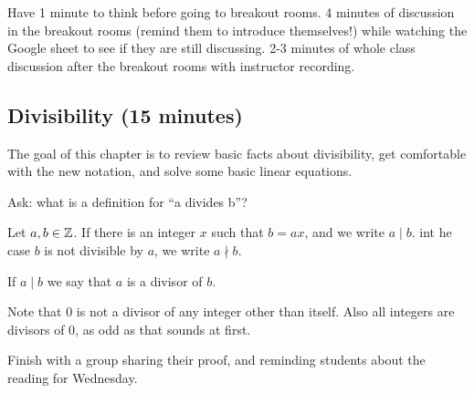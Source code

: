 \documentclass[letterpaper, 11 pt]{article}
\begin{document}
Have 1 minute to think before going to breakout rooms. 4 minutes of discussion in the breakout rooms (remind them to introduce themselves!) while watching the Google sheet to see if they are still discussing. 2-3 minutes of whole class discussion after the breakout rooms with instructor recording.

%

\subsection{Divisibility (15 minutes)}

The goal of this chapter is to review basic facts about divisibility, get comfortable with the new notation, and solve some basic linear equations.

Ask: what is a definition for ``a divides b''?

\begin{defn}
 Let $a,b\in \mathbb Z$. If there is an integer $x$ such that $b=ax$, and we write $a\mid b$. int he case $b$ is not divisible by $a$, we write $a\nmid b$.

 If $a\mid b$ we say that $a$ is a divisor of $b$.
\end{defn}
Note that 0 is not a divisor of any integer other than itself. Also all integers are divisors of 0, as odd as that sounds at first.




Finish with a group sharing their proof, and reminding students about the reading for Wednesday.

\end{document}
